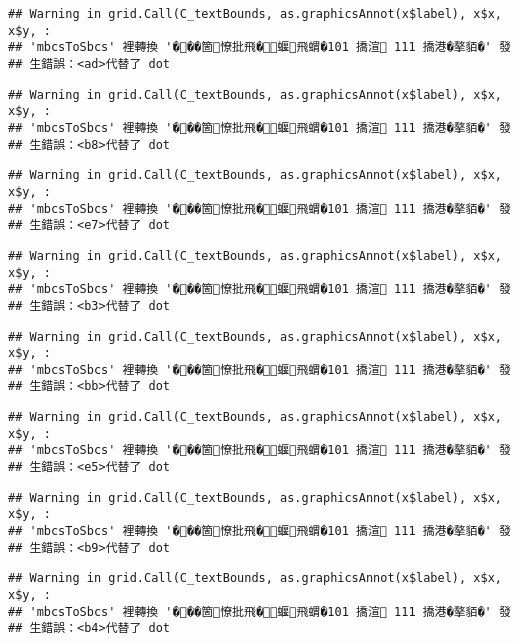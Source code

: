 \documentclass[
]{article}
\begin{document}
\begin{verbatim}
## Warning in grid.Call(C_textBounds, as.graphicsAnnot(x$label), x$x, x$y, :
## 'mbcsToSbcs' 裡轉換 '���箇憭批飛�蝘飛蝟�101 撟渲 111 撟港�摮貊�' 發
## 生錯誤：<ad>代替了 dot
\end{verbatim}

\begin{verbatim}
## Warning in grid.Call(C_textBounds, as.graphicsAnnot(x$label), x$x, x$y, :
## 'mbcsToSbcs' 裡轉換 '���箇憭批飛�蝘飛蝟�101 撟渲 111 撟港�摮貊�' 發
## 生錯誤：<b8>代替了 dot
\end{verbatim}

\begin{verbatim}
## Warning in grid.Call(C_textBounds, as.graphicsAnnot(x$label), x$x, x$y, :
## 'mbcsToSbcs' 裡轉換 '���箇憭批飛�蝘飛蝟�101 撟渲 111 撟港�摮貊�' 發
## 生錯誤：<e7>代替了 dot
\end{verbatim}

\begin{verbatim}
## Warning in grid.Call(C_textBounds, as.graphicsAnnot(x$label), x$x, x$y, :
## 'mbcsToSbcs' 裡轉換 '���箇憭批飛�蝘飛蝟�101 撟渲 111 撟港�摮貊�' 發
## 生錯誤：<b3>代替了 dot
\end{verbatim}

\begin{verbatim}
## Warning in grid.Call(C_textBounds, as.graphicsAnnot(x$label), x$x, x$y, :
## 'mbcsToSbcs' 裡轉換 '���箇憭批飛�蝘飛蝟�101 撟渲 111 撟港�摮貊�' 發
## 生錯誤：<bb>代替了 dot
\end{verbatim}

\begin{verbatim}
## Warning in grid.Call(C_textBounds, as.graphicsAnnot(x$label), x$x, x$y, :
## 'mbcsToSbcs' 裡轉換 '���箇憭批飛�蝘飛蝟�101 撟渲 111 撟港�摮貊�' 發
## 生錯誤：<e5>代替了 dot
\end{verbatim}

\begin{verbatim}
## Warning in grid.Call(C_textBounds, as.graphicsAnnot(x$label), x$x, x$y, :
## 'mbcsToSbcs' 裡轉換 '���箇憭批飛�蝘飛蝟�101 撟渲 111 撟港�摮貊�' 發
## 生錯誤：<b9>代替了 dot
\end{verbatim}

\begin{verbatim}
## Warning in grid.Call(C_textBounds, as.graphicsAnnot(x$label), x$x, x$y, :
## 'mbcsToSbcs' 裡轉換 '���箇憭批飛�蝘飛蝟�101 撟渲 111 撟港�摮貊�' 發
## 生錯誤：<b4>代替了 dot
\end{verbatim}
\end{document}
